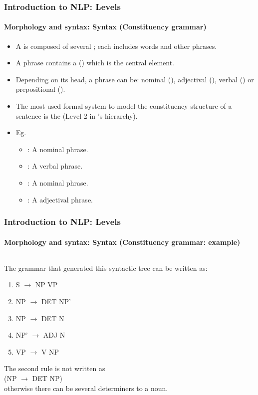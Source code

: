 \documentclass[xcolor=table]{beamer}
\begin{document}
\begin{frame}
\frametitle{Introduction to NLP: Levels}
\framesubtitle{Morphology and syntax: Syntax (Constituency grammar)}

\begin{itemize}
	\item A  is composed of several ; each includes words and other phrases.
	\item A phrase contains a  () which is the central element.
	\item Depending on its head, a phrase can be: nominal (), adjectival (), verbal () or prepositional ().
	\item The most used formal system to model the constituency structure of a sentence is the  (Level 2 in 's hierarchy).
	\item Eg. 
	\begin{itemize}
		\item {}: A nominal phrase.
		\item {}: A verbal phrase.
		\item {}: A nominal phrase.
		\item {}: A adjectival phrase.
	\end{itemize}
\end{itemize}


\end{frame}


\begin{frame}
\frametitle{Introduction to NLP: Levels}
\framesubtitle{Morphology and syntax: Syntax (Constituency grammar: example)}

\begin{columns}
	\begin{column}{0.52\textwidth}
	The grammar that generated this syntactic tree can be written as: 
	
	\begin{enumerate}
		\item S $ \rightarrow $ NP VP
		\item NP $ \rightarrow $ DET NP'
		\item NP $ \rightarrow $ DET N
		\item NP' $ \rightarrow $ ADJ N
		\item VP $ \rightarrow $ V NP
	\end{enumerate}

	The second rule is not written as \\(NP $ \rightarrow $ DET NP)\\ 
	otherwise there can be several determiners to a noun.
	
	\end{column}
	\begin{column}{0.42\textwidth}
	\end{column}%
\end{columns}


\end{frame}
\end{document}
